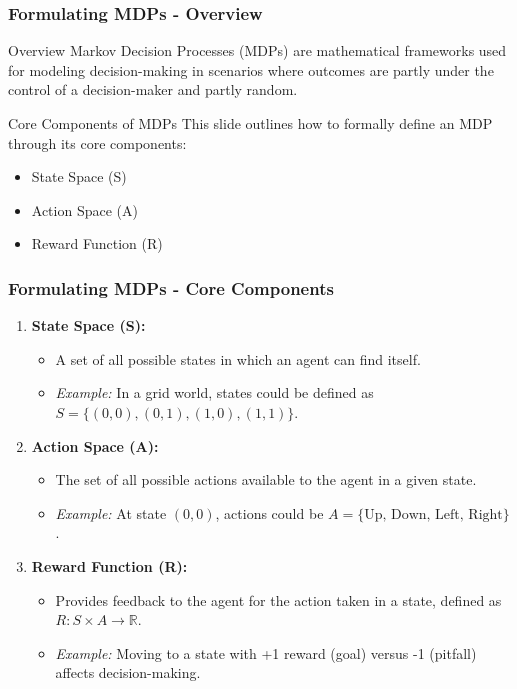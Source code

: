 \documentclass[aspectratio=169]{beamer}
\begin{document}
\begin{frame}[fragile]
    \frametitle{Formulating MDPs - Overview}
    \begin{block}{Overview}
        Markov Decision Processes (MDPs) are mathematical frameworks used for modeling decision-making in scenarios where outcomes are partly under the control of a decision-maker and partly random. 
    \end{block}
    \begin{block}{Core Components of MDPs}
        This slide outlines how to formally define an MDP through its core components: 
        \begin{itemize}
            \item State Space (S)
            \item Action Space (A)
            \item Reward Function (R)
        \end{itemize}
    \end{block}
\end{frame}

\begin{frame}[fragile]
    \frametitle{Formulating MDPs - Core Components}
    \begin{enumerate}
        \item \textbf{State Space (S):}
        \begin{itemize}
            \item A set of all possible states in which an agent can find itself.
            \item \textit{Example:} In a grid world, states could be defined as $S = \{(0,0), (0,1), (1,0), (1,1)\}$.
        \end{itemize}

        \item \textbf{Action Space (A):}
        \begin{itemize}
            \item The set of all possible actions available to the agent in a given state.
            \item \textit{Example:} At state $(0,0)$, actions could be $A = \{\text{Up, Down, Left, Right}\}$.
        \end{itemize}

        \item \textbf{Reward Function (R):}
        \begin{itemize}
            \item Provides feedback to the agent for the action taken in a state, defined as $R: S \times A \rightarrow \mathbb{R}$.
            \item \textit{Example:} Moving to a state with +1 reward (goal) versus -1 (pitfall) affects decision-making.
        \end{itemize}
    \end{enumerate}
\end{frame}
\end{document}
